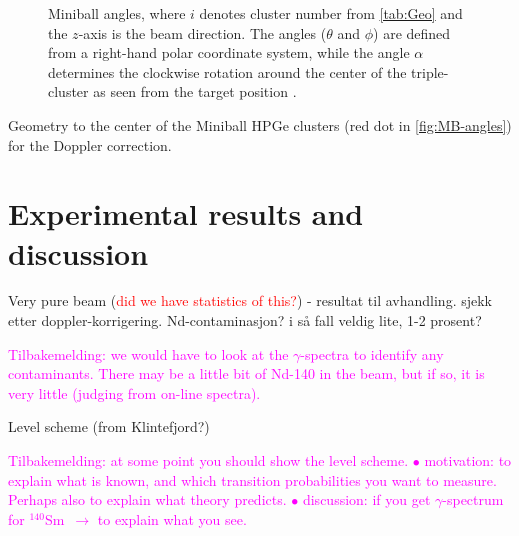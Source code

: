 \documentclass[twoside,english]{uiofysmaster/uiofysmaster}
\newcommand{\Sm}{$^{140}$Sm} %
\newcommand{\ga}{$\gamma$}
\begin{document}
\begin{figure}[ht]
	\centering
	
	\caption{Miniball angles, where $i$ denotes cluster number from \autoref{tab:Geo} and the $z$-axis is the beam direction. The angles ($\theta$ and $\phi$) are defined from a right-hand polar coordinate system, while the angle $\alpha$ determines the clockwise rotation around the center of the triple-cluster as seen from the target position \cite{NWarr-Angles}.}
	\label{fig:MB-angles}
\end{figure}


\begin{table}[ht] 
	\centering 
	\caption{Geometry to the center of the Miniball HPGe clusters (red dot in \autoref{fig:MB-angles}) for the Doppler correction.}
	
	\label{tab:Geo}
\end{table}




\chapter{Experimental results and discussion}


Very pure beam (\textcolor{red}{did we have statistics of this?}) - resultat til avhandling. sjekk etter doppler-korrigering. Nd-contaminasjon? i så fall veldig lite, 1-2 prosent?

\textcolor{Magenta}{Tilbakemelding: \newline
we would have to look at the \ga-spectra to identify any contaminants. There may be a little bit of Nd-140 in the beam, but if so, it is very little (judging from on-line spectra).}


\bigskip


Level scheme (from Klintefjord?)\newline

\textcolor{Magenta}{Tilbakemelding: \newline
at some point you should show the level scheme. \newline
$\bullet$ motivation: to explain what is known, and which transition probabilities you want to measure.  \newline
Perhaps also to explain what theory predicts. \newline
$\bullet$ discussion: if you get \ga-spectrum for \Sm\ $\rightarrow$ to explain what you see.}
\end{document}
